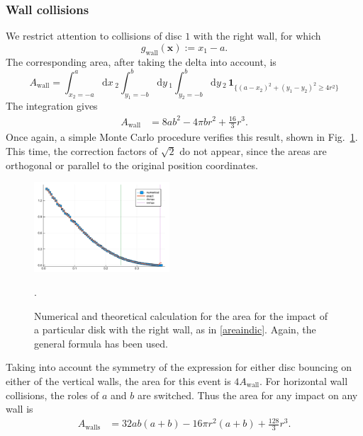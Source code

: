 \documentclass[superscriptaddress,pre,reprint,showpacs,twocolumn]{revtex4-1}
\newcommand{\rd}[1]{\mathrm{d}{#1} \,}
\newcommand{\indicatorsymbol}{\mathbf{1}}
\newcommand{\indicator}[1]{\indicatorsymbol_{ \{   #1 \} } }
\begin{document}
\subsubsection{Wall collisions}

We restrict attention to collisions of disc $1$ with the right wall, for which
$$g_\text{wall}(\mathbf{x}) := x_1 - a.$$
The corresponding area, after taking the delta into account, is
\begin{equation}\label{areaindic}
 A_\mathrm{wall} =  \int_{x_2 = -a}^a \rd x_2 
\int_{y_1 = -b}^b \rd y_1 \int_{y_2 = -b}^b \rd y_2 \, \indicator{ (a-x_2)^2 + (y_1-y_2)^2 \ge 4 r^2 }
\end{equation}
The integration gives
\begin{align}\label{areax1p}
 A_\mathrm{wall} & = 8 a b^2-4  \pi b r^2 +\frac{16}{3}r^3 .
\end{align}
Once again, a simple Monte Carlo procedure verifies this result,
shown in Fig.~\ref{area1derecha}. 
This time, the correction factors of $\sqrt{2}$ do not appear, since
the areas are orthogonal or parallel to the original
position coordinates.


\begin{figure}
\centering
\includegraphics[width=0.45\textwidth]{./figures/AreaWall01.pdf}
\caption{Numerical and theoretical calculation for the area
for the impact of a particular disk with the right wall, as in \eqref{areaindic}.
Again, the general formula has been used.}
\label{area1derecha}.
\end{figure}

Taking into account the symmetry of the expression for either disc
 bouncing on either of the vertical walls, the
area for this event is  $4A_\text{wall}$. For horizontal wall 
collisions, the roles of $a$ and $b$ are switched.
Thus the area for any impact on any wall is
\begin{align}\label{areawalls}
 A_\text{walls} & = 32 a b (a+b)-16 \pi r^2 (a+b) +\frac{128}{3}r^3.
\end{align}
\end{document}
